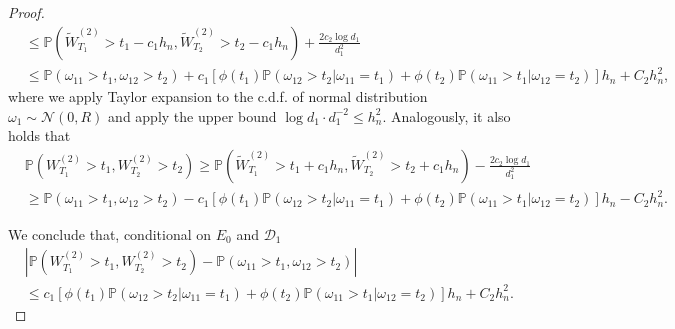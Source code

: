 \documentclass[12pt]{article}
\newcommand{\abs}[1]{\left\lvert#1\right\rvert}
\newcommand{\PP}{\mathbb{P}}
\newcommand{\cD}{\mathcal{D}}
\newcommand{\cN}{\mathcal{N}}
\def\PP{{\mathbb P}}
\theoremstyle{plain}
\begin{document}
\begin{proof}
\begin{equation*}
\begin{aligned}
    &\le \PP(\widetilde{W}^{(2)}_{T_1} >t_1-c_1 h_n, \widetilde{W}^{(2)}_{T_2}>t_2-c_1 h_n) +\frac{2c_2 \log d_1}{d_1^2} \\
    &\le \PP(\omega_{11}>t_1,\omega_{12}>t_2 ) +c_1\left[\phi(t_1)\PP(\omega_{12}>t_2|\omega_{11}=t_1) +\phi(t_2)\PP(\omega_{11}>t_1|\omega_{12}=t_2)\right]h_n +C_2 h_n^2,
    \end{aligned}
\end{equation*}
where we apply Taylor expansion to the c.d.f. of normal distribution $\omega_1 \sim \cN(0,R)$ and apply the upper bound $\log d_1 \cdot d_1^{-2} \le h_n^2$. Analogously, it also holds that
\begin{equation*}
    \begin{aligned}
    &\PP(W^{(2)}_{T_1} >t_1, W^{(2)}_{T_2}>t_2)\ge \PP(\widetilde{W}^{(2)}_{T_1} >t_1+c_1 h_n, \widetilde{W}^{(2)}_{T_2}>t_2+c_1 h_n) -\frac{2c_2 \log d_1}{d_1^2} \\
    &\ge \PP(\omega_{11}>t_1,\omega_{12}>t_2 ) -c_1\left[\phi(t_1)\PP(\omega_{12}>t_2|\omega_{11}=t_1) +\phi(t_2)\PP(\omega_{11}>t_1|\omega_{12}=t_2)\right]h_n -C_2 h_n^2.
    \end{aligned}
\end{equation*}

We conclude that, conditional on $E_0$ and $\cD_1$
\begin{equation*}
\begin{aligned}
&\abs{\PP(W^{(2)}_{T_1} >t_1, W^{(2)}_{T_2}>t_2 )-\PP(\omega_{11}>t_1,\omega_{12}>t_2 ) }\\
& \le c_1\left[\phi(t_1)\PP(\omega_{12}>t_2|\omega_{11}=t_1) +\phi(t_2)\PP(\omega_{11}>t_1|\omega_{12}=t_2)\right]h_n + C_2 h_n^2.
\end{aligned}
\end{equation*}



\end{proof}
\end{document}
